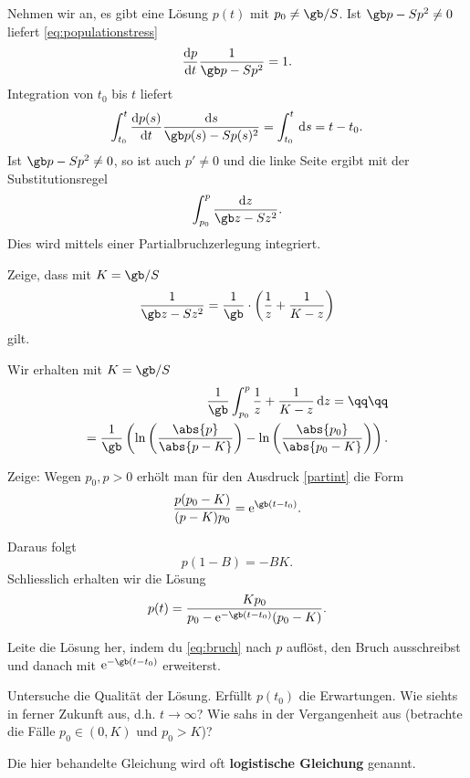 \documentclass[%
11pt,%
twoside,%
titlepage,%
german,%
headsepline%
]{scrartcl}
\begin{document}
Nehmen wir an, es gibt eine L\"osung $p(t)$ mit $p_0\neq\gb/S$. Ist $\gb p-Sp^2\neq0$ liefert \eqref{eq:populationstress}
$$\frac{\mathrm{d}p}{\mathrm{d}t}\frac{1}{\gb p-Sp^2}=1.$$
Integration von $t_0$ bis $t$ liefert
$$\int_{t_0}^t\frac{\mathrm{d}p(s)}{\mathrm{d}t}\frac{\mathrm{d}s}{\gb p(s)-Sp(s)^2}=\int_{t_0}^t\,\mathrm{d}s=t-t_0.$$
Ist $\gb p-Sp^2\neq0$, so ist auch $p'\neq0$ und die linke Seite ergibt mit der Substitutionsregel
$$\int_{p_0}^p\frac{\mathrm{d}z}{\gb z-Sz^2}.$$
Dies wird mittels einer Partialbruchzerlegung integriert.
\begin{ueb}
Zeige, dass mit $K=\gb/S$
$$\frac{1}{\gb z-Sz^2}=\frac{1}{\gb}\cdot\left(\frac{1}{z}+\frac{1}{K-z}\right)$$
gilt.
\end{ueb}
\noindent Wir erhalten mit $K=\gb/S$
\begin{equation}\label{partint}
\begin{split}
\frac{1}{\gb}\int_{p_0}^p\frac{1}{z}+\frac{1}{K-z}\,\mathrm{d}z=\qq\qq\\
=\frac{1}{\gb}\left(\ln\left(\frac{\abs{p}}{\abs{p-K}}\right)-\ln\left(\frac{\abs{p_0}}{\abs{p_0-K}}\right)\right).
\end{split}
\end{equation}
\begin{ueb}
Zeige: Wegen $p_0,p>0$ erh\"olt man f\"ur den Ausdruck \eqref{partint} die Form
$$\frac{p(p_0-K)}{(p-K)p_0}=\mathrm{e}^{\gb(t-t_0)}.$$
\end{ueb}
\noindent Daraus folgt
\begin{equation}\label{eq:bruch}
p(1-B)=-BK.
\end{equation}
Schliesslich erhalten wir die L\"osung
$$p(t)=\frac{Kp_0}{p_0-\mathrm{e}^{-\gb(t-t_0)}(p_0-K)}.$$

\begin{ueb}
Leite die L\"osung her, indem du \eqref{eq:bruch} nach $p$ aufl\"ost, den Bruch ausschreibst und danach mit $\mathrm{e}^{-\gb(t-t_0)}$ erweiterst.
\end{ueb}

\begin{ueb}
Untersuche die Qualit\"at der L\"osung. Erf\"ullt $p(t_0)$ die Erwartungen. Wie siehts in ferner Zukunft aus, d.h. $t\to\infty$? Wie sahs in der Vergangenheit aus (betrachte die F\"alle $p_0\in(0,K)$ und $p_0>K$)?
\end{ueb}

\begin{bem}
Die hier behandelte Gleichung wird oft \textbf{logistische Gleichung} genannt.
\end{bem}
\end{document}
